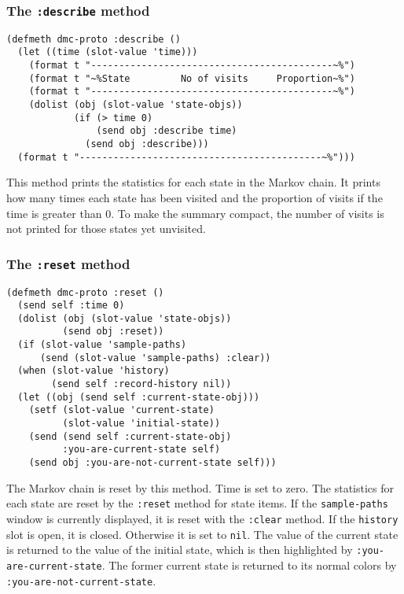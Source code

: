\subsubsection{The {\tt :describe} method}
\label{subsubsec:dmc-describe}
\begin{verbatim}
(defmeth dmc-proto :describe ()
  (let ((time (slot-value 'time)))
    (format t "-------------------------------------------~%")
    (format t "~%State         No of visits     Proportion~%")
    (format t "-------------------------------------------~%")
    (dolist (obj (slot-value 'state-objs))
            (if (> time 0) 
                (send obj :describe time)
              (send obj :describe)))
  (format t "-------------------------------------------~%")))
\end{verbatim}
This method prints the statistics for each state in the Markov chain.
It prints how many times each state has been visited and the
proportion of visits if the time is greater than 0. To make the
summary compact, the number of visits is not printed for those states
yet unvisited. 

\subsubsection{The {\tt :reset} method}
\label{subsubsec:reset}
\begin{verbatim}
(defmeth dmc-proto :reset ()
  (send self :time 0)
  (dolist (obj (slot-value 'state-objs))
          (send obj :reset))
  (if (slot-value 'sample-paths)
      (send (slot-value 'sample-paths) :clear))
  (when (slot-value 'history)
        (send self :record-history nil))
  (let ((obj (send self :current-state-obj)))
    (setf (slot-value 'current-state)
          (slot-value 'initial-state))
    (send (send self :current-state-obj) 
          :you-are-current-state self)
    (send obj :you-are-not-current-state self)))
\end{verbatim}
The Markov chain is reset by this method.  Time is set to zero.  The 
statistics for each state are reset by the {\tt :reset} method for state 
items.  If the {\tt sample-paths} window is currently displayed, it is 
reset with the {\tt :clear} method.  If the {\tt history} slot is
open, it is  closed.  Otherwise it is set to {\tt nil}.
The value of the current state is returned to the value of the initial
state, which is then highlighted by {\tt :you-are-current-state}.  The
former current state is returned to its normal colors by {\tt
  :you-are-not-current-state}. 


